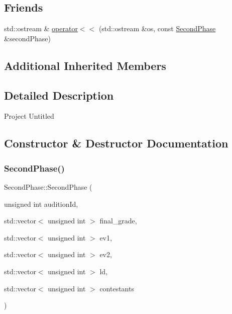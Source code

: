 \subsection*{Friends}
\begin{DoxyCompactItemize}
\item 
std\+::ostream \& \hyperlink{class_second_phase_a8b0fca2bfcb7697b3e998ea39ef2f5cb}{operator$<$$<$} (std\+::ostream \&os, const \hyperlink{class_second_phase}{Second\+Phase} \&second\+Phase)
\end{DoxyCompactItemize}
\subsection*{Additional Inherited Members}


\subsection{Detailed Description}
Project Untitled 

\subsection{Constructor \& Destructor Documentation}
\mbox{\label{class_second_phase_ac22a81240fb312f9ecdb1d8edb72ea9d}} 
\subsubsection{\texorpdfstring{Second\+Phase()}{SecondPhase()}\hspace{0.1cm}{\footnotesize\ttfamily [1/2]}}
{\footnotesize\ttfamily Second\+Phase\+::\+Second\+Phase (\begin{DoxyParamCaption}\item[{unsigned int}]{audition\+Id,  }\item[{std\+::vector$<$ unsigned int $>$}]{final\+\_\+grade,  }\item[{std\+::vector$<$ unsigned int $>$}]{ev1,  }\item[{std\+::vector$<$ unsigned int $>$}]{ev2,  }\item[{std\+::vector$<$ unsigned int $>$}]{ld,  }\item[{std\+::vector$<$ unsigned int $>$}]{contestants }\end{DoxyParamCaption})}




